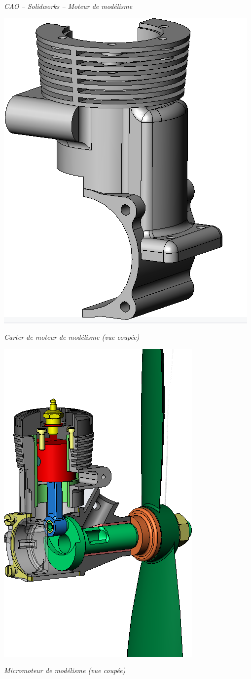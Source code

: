 \documentclass[11pt,oneside]{article}
\begin{document}
\begin{exemple}
\textit{CAO -- Solidworks -- Moteur de modélisme}


\begin{minipage}[c]{.45\linewidth}
\begin{center}
\includegraphics[width=.45\textwidth]{png/carter}

\textit{Carter de moteur de modélisme (vue coupée)}
\end{center} 
\end{minipage} \hfill
\begin{minipage}[c]{.45\linewidth}
\begin{center}
\includegraphics[width=.45\textwidth]{png/micromoteur}

\textit{Micromoteur de modélisme (vue coupée)}
\end{center} 
\end{minipage} 




\end{exemple}
\end{document}
